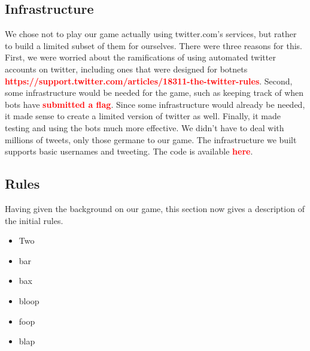 \documentclass[11pt, oneside]{article} %
\numberwithin{equation}{section} %
\numberwithin{figure}{section} %
\numberwithin{table}{section} %
\newcommand\todo[1]{\textbf{\textcolor{red}{#1}}}
\begin{document}
	\subsection{Infrastructure}
		We chose not to play our game actually using twitter.com's services,
		but rather to build a limited subset of them for ourselves. There were
		three reasons for this. First, we were worried about the ramifications
		of using automated twitter accounts on twitter, including ones
		that were designed for botnets \todo{https://support.twitter.com/articles/18311-the-twitter-rules}.
		Second, some infrastructure would be needed for the game, such as
		keeping track of when bots have \todo{submitted a flag}. Since some infrastructure
		would already be needed, it made sense to create a limited version of twitter as well.
		Finally, it made testing and using the bots much more effective. We didn't have
		to deal with millions of tweets, only those germane to our game.
		The infrastructure we built supports basic usernames and tweeting.
		The code is available \todo{here}.

	\subsection{Rules}
		Having given the background on our game, this section now gives a description
		of the initial rules.
		\begin{itemize}
		 \item Two 
		 \item bar
		 \item bax
		 \item bloop
		 \item foop
		 \item blap
		\end{itemize}


\end{document}
